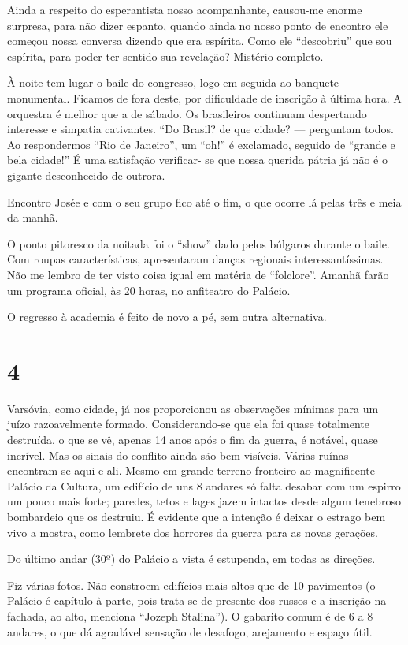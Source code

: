 Ainda a respeito do esperantista nosso acompanhante, causou-me enorme surpresa, para não dizer espanto, quando ainda no nosso ponto de encontro ele começou nossa conversa dizendo que era espírita. Como ele ``descobriu'' que sou espírita, para poder ter sentido sua revelação? Mistério completo.

À noite tem lugar o baile do congresso, logo em seguida ao banquete monumental. Ficamos de fora deste, por dificuldade de inscrição à última hora. A orquestra é melhor que a de sábado. Os brasileiros continuam despertando interesse e simpatia cativantes. ``Do Brasil? de que cidade? --- perguntam todos. Ao respondermos ``Rio de Janeiro'', um ``oh!'' é exclamado, seguido de ``grande e bela cidade!'' É uma satisfação verificar- se que nossa querida pátria já não é o gigante desconhecido de outrora.

Encontro Josée e com o seu grupo fico até o fim, o que ocorre lá pelas três e meia da manhã.

O ponto pitoresco da noitada foi o ``show'' dado pelos búlgaros durante o baile. Com roupas características, apresentaram danças regionais interessantíssimas. Não me lembro de ter visto coisa igual em matéria de ``folclore''. Amanhã farão um programa oficial, às 20 horas, no anfiteatro do Palácio.

O regresso à academia é feito de novo a pé, sem outra alternativa.

\section*{4 \adfflatleafright {}}
Varsóvia, como cidade, já nos proporcionou as observações mínimas para um juízo razoavelmente formado. Considerando-se que ela foi quase totalmente destruída, o que se vê, apenas 14 anos após o fim da guerra, é notável, quase incrível. Mas os sinais do conflito ainda são bem visíveis. Várias ruínas encontram-se aqui e ali. Mesmo em grande terreno fronteiro ao magnificente Palácio da Cultura, um edifício de uns 8 andares só falta desabar com um espirro um pouco mais forte; paredes, tetos e lages jazem intactos desde algum tenebroso bombardeio que os destruiu. É evidente que a intenção é deixar o estrago bem vivo a mostra, como lembrete dos horrores da guerra para as novas gerações.

Do último andar (30º) do Palácio a vista é estupenda, em todas as direções.

Fiz várias fotos. Não constroem edifícios mais altos que de 10 pavimentos (o Palácio é capítulo à parte, pois trata-se de presente dos russos e a inscrição na fachada, ao alto, menciona ``Jozeph Stalina''). O gabarito comum é de 6 a 8 andares, o que dá agradável sensação de desafogo, arejamento e espaço útil.

